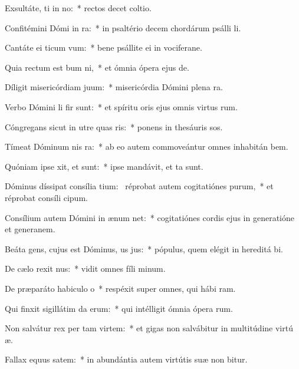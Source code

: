 \item Exsultáte, ti in no:~* rectos decet coltio.
\item Confitémini Dómi in ra:~* in psaltério decem chordárum psálli li.
\item Cantáte ei ticum vum:~* bene psállite ei in vociferane.
\item Quia rectum est bum ni,~* et ómnia ópera ejus  de.
\item Díligit misericórdiam  juum:~* misericórdia Dómini plena  ra.
\item Verbo Dómini li fir sunt:~* et spíritu oris ejus omnis virtus rum.
\item Cóngregans sicut in utre quas ris:~* ponens in thesáuris sos.
\item Tímeat Dóminum nis ra:~* ab eo autem commoveántur omnes inhabitán bem.
\item Quóniam ipse xit, et  sunt:~* ipse mandávit, et ta sunt.
\item Dóminus díssipat consília tium:~\pscross{} réprobat autem cogitatiónes purum,~* et réprobat consíli cipum.
\item Consílium autem Dómini in ænum net:~* cogitatiónes cordis ejus in generatióne et generanem.
\item Beáta gens, cujus est Dóminus, us jus:~* pópulus, quem elégit in hereditá bi.
\item De cælo rexit nus:~* vidit omnes fíli minum.
\item De præparáto habiculo o~* respéxit super omnes, qui hábi ram.
\item Qui finxit sigillátim da erum:~* qui intélligit ómnia ópera rum.
\item Non salvátur rex per tam virtem:~* et gigas non salvábitur in multitúdine virtú æ.
\item Fallax equus  satem:~* in abundántia autem virtútis suæ non bitur.
